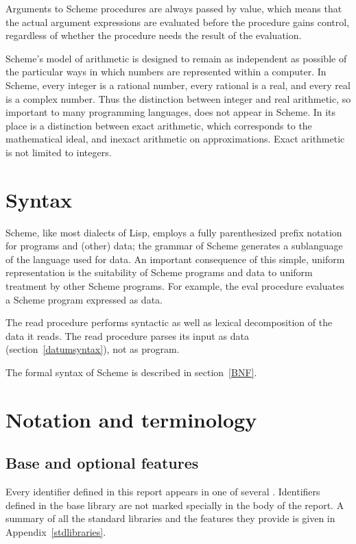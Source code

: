 \vest Arguments to Scheme procedures are always passed by value, which
means that the actual argument expressions are evaluated before the
procedure gains control, regardless of whether the procedure needs the
result of the evaluation.  

\vest Scheme's model of arithmetic is designed to remain as independent as
possible of the particular ways in which numbers are represented within a
computer. In Scheme, every integer is a rational number, every rational is a
real, and every real is a complex number.  Thus the distinction between integer
and real arithmetic, so important to many programming languages, does not
appear in Scheme.  In its place is a distinction between exact arithmetic,
which corresponds to the mathematical ideal, and inexact arithmetic on
approximations.  Exact arithmetic is not limited to integers.

\section{Syntax}

Scheme, like most dialects of Lisp, employs a fully parenthesized prefix
notation for programs and (other) data; the grammar of Scheme generates a
sublanguage of the language used for data.  An important
consequence of this simple, uniform representation is the suitability of
Scheme programs and data to uniform treatment by other Scheme programs.
For example, the {\cf eval} procedure evaluates a Scheme program expressed
as data.

The {\cf read} procedure performs syntactic as well as lexical decomposition of
the data it reads.  The {\cf read} procedure parses its input as data
(section~\ref{datumsyntax}), not as program.

The formal syntax of Scheme is described in section~\ref{BNF}.


\section{Notation and terminology}


\subsection{Base and optional features}
\label{qualifiers}

Every identifier defined in this report appears in one of several
.  Identifiers defined in the base library
are not marked specially in the body of the report.  A summary of
all the standard libraries and the features they provide is given in
Appendix~\ref{stdlibraries}.

